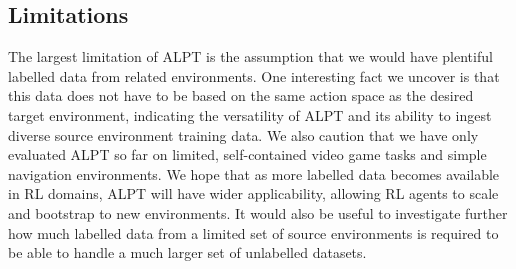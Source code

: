\documentclass{article} %
\begin{document}
\subsection{Limitations}
The largest limitation of ALPT is the assumption that we would have plentiful labelled data from related environments.  One interesting fact we uncover is that this data does not have to be based on the same action space as the desired target environment, indicating the versatility of ALPT and its ability to ingest diverse source environment training data.  We also caution that we have only evaluated ALPT so far on limited, self-contained video game tasks and simple navigation environments. %
We hope that as more labelled data becomes available in RL domains, ALPT will have wider applicability, allowing RL agents to scale and bootstrap to new environments.  It would also be useful to investigate further how much labelled data from a limited set of source environments is required to be able to handle a much larger set of unlabelled datasets. 
\newpage




\newpage
\appendix
\end{document}
